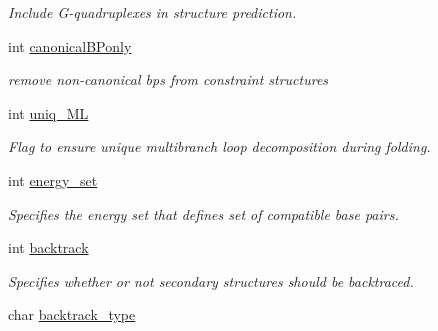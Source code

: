 \begin{DoxyCompactItemize}
\begin{DoxyCompactList}\small\item\em Include G-\/quadruplexes in structure prediction. \end{DoxyCompactList}\item 
\hypertarget{group__model__details_a87edce006e9daff84363ec0e6abd2182}{}int \hyperlink{group__model__details_a87edce006e9daff84363ec0e6abd2182}{canonical\+B\+Ponly}\label{group__model__details_a87edce006e9daff84363ec0e6abd2182}

\begin{DoxyCompactList}\small\item\em remove non-\/canonical bp\textquotesingle{}s from constraint structures \end{DoxyCompactList}\item 
\hypertarget{group__model__details_ade065b814a4e2e72ead93ab502613ed2}{}int \hyperlink{group__model__details_ade065b814a4e2e72ead93ab502613ed2}{uniq\+\_\+\+M\+L}\label{group__model__details_ade065b814a4e2e72ead93ab502613ed2}

\begin{DoxyCompactList}\small\item\em Flag to ensure unique multibranch loop decomposition during folding. \end{DoxyCompactList}\item 
\hypertarget{group__model__details_a5eee4e3b468eb690d1407e0178dafb3f}{}int \hyperlink{group__model__details_a5eee4e3b468eb690d1407e0178dafb3f}{energy\+\_\+set}\label{group__model__details_a5eee4e3b468eb690d1407e0178dafb3f}

\begin{DoxyCompactList}\small\item\em Specifies the energy set that defines set of compatible base pairs. \end{DoxyCompactList}\item 
\hypertarget{group__model__details_a31f4471608cbdd03887f63c281823adb}{}int \hyperlink{group__model__details_a31f4471608cbdd03887f63c281823adb}{backtrack}\label{group__model__details_a31f4471608cbdd03887f63c281823adb}

\begin{DoxyCompactList}\small\item\em Specifies whether or not secondary structures should be backtraced. \end{DoxyCompactList}\item 
\hypertarget{group__model__details_abb265da25121d22ed11c8435861f0e53}{}char \hyperlink{group__model__details_abb265da25121d22ed11c8435861f0e53}{backtrack\+\_\+type}\label{group__model__details_abb265da25121d22ed11c8435861f0e53}


\end{DoxyCompactItemize}

